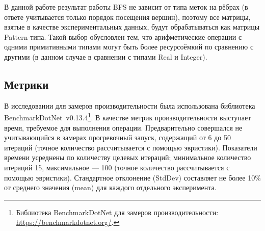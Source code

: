 \begin{table}
\begin{center}
\caption{Разреженные матричные данные}
\label{tbl:matrices}
\end{center}
\end{table}

В данной работе результат работы BFS не зависит от типа меток на рёбрах (в ответе учитывается только порядок посещения вершин), поэтому все матрицы, взятые в качестве экспериментальных данных, будут обрабатываться как матрицы Pattern-типа. Такой выбор обусловлен тем, что арифметические операции с одними примитивными типами могут быть более ресурсоёмкий по сравнению с другими (в данном случае в сравнении с типами Real и Integer).

\subsection{Метрики}

В исследовании для замеров производительности была использована библиотека Bench\-mark\-Dot\-Net~v0.13.4\footnote{Библиотека BenchmarkDotNet для замеров производительности: \url{https://benchmarkdotnet.org/}.}. В качестве метрик производительности выступает время, требуемое для выполнения операции. Предварительно совершался не учитывающийся в замерах прогревочный запуск, содержащий от 6 до 50 итераций (точное количество рассчитывается с помощью эвристики). Показатели времени усреднены по количеству целевых итераций; минимальное количество итераций 15, максимальное --- 100 (точное количество рассчитывается с помощью эвристики). Стандартное отклонение (StdDev) составляет не более 10\% от среднего значения (mean) для каждого отдельного эксперимента. 


